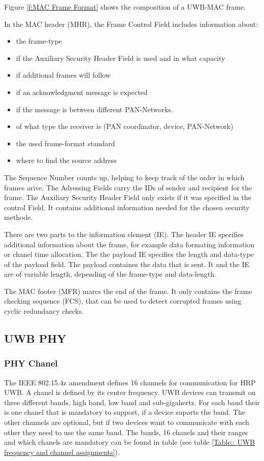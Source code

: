 Figure \ref{f:MAC Frame Format} shows the composition of a UWB-MAC frame.

In the MAC header (MHR), the Frame Control Field includes information about:

\begin{itemize}
  \item the frame-type
  \item if the Auxiliary Security Header Field is used and in what capacity
  \item if additional frames will follow
  \item if an acknowledgment message is expected
  \item if the message is between different PAN-Networks.
  \item of what type the receiver is (PAN coordinator, device, PAN-Network)
  \item the used frame-format standard
  \item where to find the source address
\end{itemize}

The Sequence Number counts up, helping to keep track of the order in which frames arive.
The Adressing Fields carry the IDs of sender and recipient for the frame.
The Auxiliary Security Header Field only exists if it was specified in the control Field.
It contains additional information needed for the chosen security methode.

There are two parts to the information element (IE).
The header IE specifies additional information about the frame, for example data formating information or chanel time allocation.
The the payload IE specifies the length and data-type of the payload field.
The payload containes the data that is sent.
It and the IE are of variable length, depending of the frame-type and data-length.

The MAC footer (MFR) marcs the end of the frame.
It only contains the frame checking sequence (FCS), that can be used to detect corrupted frames using cyclic redundancy checks.

\subsection{UWB PHY}

\subsubsection{PHY Chanel}

The IEEE 802.15.4z amendment defines 16 channels for communication for HRP UWB. 
A chanel is defined by its center frequency.
UWB devices can transmit on three different bands, high band, low band and sub-gigahertz.
For each band their is one chanel that is mandatory to support, if a device suports the band.
The other channels are optional, but if two devices want to communicate with each other they need to use the same band.
The bands, 16 chanels and their ranges and which chanels are mandatory can be found in table  (see table \ref{Table:: UWB frequency and channel assignments}).


